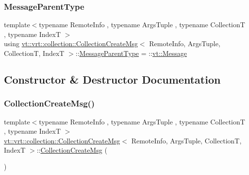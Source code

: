 \mbox{\label{structvt_1_1vrt_1_1collection_1_1_collection_create_msg_adc7277434e5007114ad1fd10ee7cc3ec}} 
\subsubsection{\texorpdfstring{Message\+Parent\+Type}{MessageParentType}}
{\footnotesize\ttfamily template$<$typename Remote\+Info , typename Args\+Tuple , typename CollectionT , typename IndexT $>$ \\
using \hyperlink{structvt_1_1vrt_1_1collection_1_1_collection_create_msg}{vt\+::vrt\+::collection\+::\+Collection\+Create\+Msg}$<$ Remote\+Info, Args\+Tuple, CollectionT, IndexT $>$\+::\hyperlink{structvt_1_1messaging_1_1_active_msg_ac2e6d93267991027ce78c968b17064c7}{Message\+Parent\+Type} =  \+::\hyperlink{namespacevt_a3a3ddfef40b4c90915fa43cdd5f129ea}{vt\+::\+Message}}



\subsection{Constructor \& Destructor Documentation}
\mbox{\label{structvt_1_1vrt_1_1collection_1_1_collection_create_msg_a26a913507e16eabcb1949dc0f01d2b31}} 
\subsubsection{\texorpdfstring{Collection\+Create\+Msg()}{CollectionCreateMsg()}\hspace{0.1cm}{\footnotesize\ttfamily [1/2]}}
{\footnotesize\ttfamily template$<$typename Remote\+Info , typename Args\+Tuple , typename CollectionT , typename IndexT $>$ \\
\hyperlink{structvt_1_1vrt_1_1collection_1_1_collection_create_msg}{vt\+::vrt\+::collection\+::\+Collection\+Create\+Msg}$<$ Remote\+Info, Args\+Tuple, CollectionT, IndexT $>$\+::\hyperlink{structvt_1_1vrt_1_1collection_1_1_collection_create_msg}{Collection\+Create\+Msg} (\begin{DoxyParamCaption}{ }\end{DoxyParamCaption})\hspace{0.3cm}{\ttfamily [default]}}

